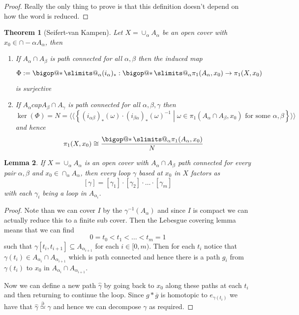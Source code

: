 \documentclass[11pt]{article}
\makeatletter
\newcommand{\defeq}{:=}
\newcommand{\homrel}{\stackrel{\partial}{\simeq}}
\newcommand{\relmiddle}[1]{\mathrel{}\middle#1\mathrel{}}
\newcommand{\rmv}{\relmiddle|}
\DeclareRobustCommand\bigop[1]{%
  \mathop{\vphantom{\sum}\mathpalette\bigop@{#1}}\slimits@
}
\newcommand{\bigop@}[2]{%
  \vcenter{%
    \sbox\z@{$#1\sum$}%
    \hbox{\resizebox{\ifx#1\displaystyle.9\fi\dimexpr\ht\z@+\dp\z@}{!}{$\m@th#2$}}%
  }%
}
\newcommand{\bigast}{\DOTSB\bigop{\ast}}
\newtheorem{theorem}{Theorem}[section]
\newtheorem{lemma}[theorem]{Lemma}
\makeatother
\begin{document}
\begin{proof}
Really the only thing to prove is that this definition doesn't depend on how the word is reduced.
\end{proof}

\begin{theorem}[Seifert-van Kampen]
Let $X=\cup_\alpha A_\alpha$ be an open cover with $x_0\in\cap-\alpha A_\alpha$, then
\begin{enumerate}[label=(\roman*)]
	\item If $A_\alpha\cap A_\beta$ is path connected for all $\alpha, \beta$ then the induced map
		\[
			\Phi\defeq\bigast_\alpha(i_\alpha)_\ast:\bigast_\alpha \pi_1(A_\alpha, x_0) \to \pi_1(X, x_0)
		\]
		is surjective
	\item If $A_\alpha cap A_\beta \cap A_\gamma$ is path connected for all $\alpha, \beta, \gamma$ then
		\[
			\ker(\Phi)=N=\langle\langle\left\{(i_{\alpha\beta})_\ast(\omega)\cdot(i_{\beta\alpha})_\ast(\omega)^{-1} \rmv \omega\in\pi_1(A_\alpha\cap A_\beta, x_0)\text{ for some }\alpha,\beta\right\}\rangle\rangle
		\]
		and hence 
		\[
			\pi_1(X, x_0)\cong \frac{\bigast_\alpha \pi_1(A_\alpha, x_0)}{N}
		\]
\end{enumerate}
\end{theorem}

\begin{lemma}
If $X=\cup_\alpha A_\alpha$ is an open cover with $A_\alpha \cap A_\beta$ path connected for every pair $\alpha, \beta$ and $x_0\in\cap_\alpha A_\alpha$, then every loop $\gamma$ based at $x_0$ in $X$ factors as
\[
[\gamma]=[\gamma_1]\cdot[\gamma_2]\cdot\dots\cdot[\gamma_m]
\]
with each $\gamma_i$ being a loop in $A_{\alpha_i}$.
\end{lemma}

\begin{proof}
Note than we can cover $I$ by the $\gamma^{-1}(A_\alpha)$ and since $I$ is compact we can actually reduce this to a finite sub cover.
Then the Lebesgue covering lemma means that we can find
\[
0=t_0 < t_1 < \dots < t_m = 1
\]
such that $\gamma[t_i, t_{i+1}]\subseteq A_{\alpha_{i+1}}$ for each $i\in[0, m)$.
Then for each $t_i$ notice that $\gamma(t_i)\in A_{\alpha_i}\cap A_{\alpha_{i+1}}$ which is path connected and hence there is a path $g_i$ from $\gamma(t_i)$ to $x_0$ in $A_{\alpha_i}\cap A_{\alpha_{i+1}}$.


Now we can define a new path $\hat{\gamma}$ by going back to $x_0$ along these paths at each $t_i$ and then returning to continue the loop.
Since $g\ast\overline{g}$ is homotopic to $e_{\gamma(t_i)}$ we have that $\hat{\gamma}\homrel\gamma$ and hence we can decompose $\gamma$ as required.
\end{proof}
\end{document}
